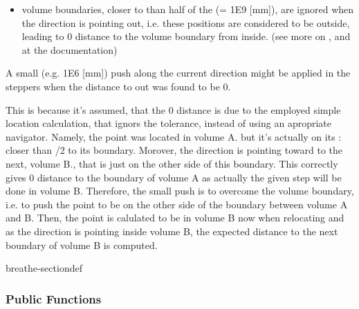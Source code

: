 \documentclass[letterpaper,10pt,english]{sphinxmanual}
\begin{document}
\begin{fulllineitems}
\begin{itemize}
\item {} 
\sphinxAtStartPar
volume boundaries, closer to  than half of the  (= 1E\sphinxhyphen{}9 {[}mm{]}), are ignored when the direction is pointing out, i.e. these positions are considered to be outside, leading to 0 distance to the volume boundary from inside. (see more on ,  and  at the  documentation)

\end{itemize}


\sphinxAtStartPar
A small (e.g. 1E\sphinxhyphen{}6 {[}mm{]}) push along the current direction might be applied in the steppers when the distance to out was found to be 0.

\sphinxAtStartPar
This is because it’s assumed, that the 0 distance is due to the employed simple location calculation, that ignors the tolerance, instead of using an apropriate navigator. Namely, the point was located in volume A. but it’s actually on its : closer than /2 to its boundary. Morover, the direction is pointing toward to the next, volume B., that is just on the other side of this boundary. This correctly gives 0 distance to the boundary of volume A as actually the given step will be done in volume B. Therefore, the small push is to overcome the volume boundary, i.e. to push the point to be on the other side of the boundary between volume A and B. Then, the point is calulated to be in volume B now when relocating and as the direction is pointing inside volume B, the expected distance to the next boundary of volume B is computed. 

\begin{sphinxuseclass}{breathe-sectiondef}\subsubsection*{Public Functions}


\end{sphinxuseclass}
\end{fulllineitems}
\end{document}
